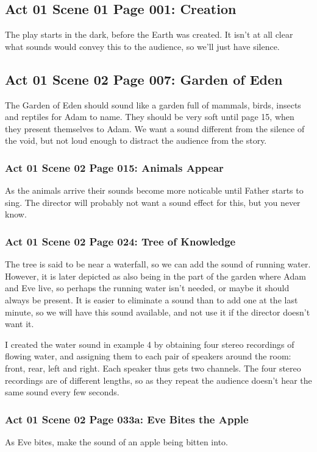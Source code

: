 \documentclass[letterpaper,twoside]{article}
\begin{document}
\subsection{Act 01 Scene 01 Page 001: Creation}
The play starts in the dark, before the Earth was created.
It isn't at all clear what sounds would convey this to the
audience, so we'll just have silence.

\subsection{Act 01 Scene 02 Page 007: Garden of Eden}
The Garden of Eden should sound like a garden full of mammals,
birds, insects and reptiles for Adam to name.  They should be
very soft until page 15, when they present themselves to Adam.
We want a sound different from the silence
of the void, but not loud enough to distract the audience
from the story.

\subsubsection{Act 01 Scene 02 Page 015: Animals Appear}
As the animals arrive their sounds become more noticable until
Father starts to sing.  The director will probably not want a
sound effect for this, but you never know.

\subsubsection{Act 01 Scene 02 Page 024: Tree of Knowledge}
The tree is said to be near a waterfall, so we can add the sound
of running water.  However, it is later depicted as also being in the
part of the garden where Adam and Eve live, so perhaps the
running water isn't needed, or maybe it should always be present.
It is easier to eliminate a sound
than to add one at the last minute, so we will have this sound
available, and not use it if the director doesn't want it.

I created the water sound in example 4 by obtaining four
stereo recordings of flowing water, and assigning them to
each pair of speakers around the room: front, rear, left and right.
Each speaker thus gets two channels.  The four stereo recordings
are of different lengths, so as they repeat the audience doesn't
hear the same sound every few seconds.

\subsubsection{Act 01 Scene 02 Page 033a: Eve Bites the Apple}
As Eve bites, make the sound of an apple being bitten into.
\end{document}
